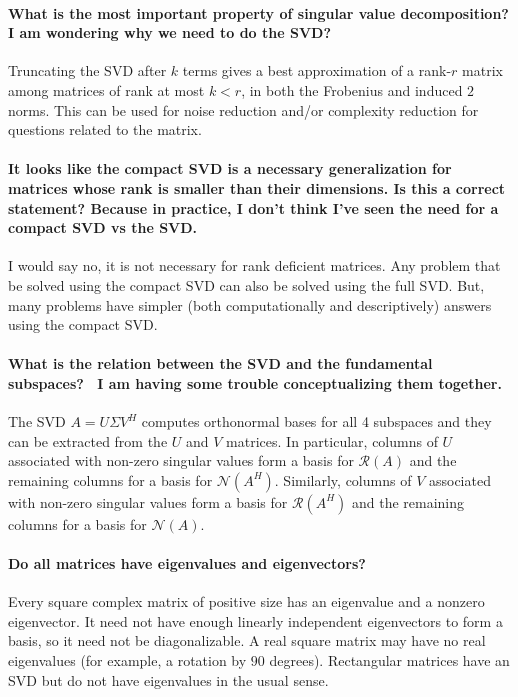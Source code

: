\documentclass[10pt,english]{article}
\begin{document}
\paragraph{What is the most important property of singular value decomposition? I am wondering why we need to do the SVD?}

Truncating the SVD after $k$ terms gives a best approximation of a rank-$r$ matrix among matrices of rank at most $k<r$, in both the Frobenius and induced $2$ norms.
This can be used for noise reduction and/or complexity reduction for questions related to the matrix.




\paragraph{It looks like the compact SVD is a necessary generalization for matrices whose rank is smaller than their dimensions. Is this a correct statement? Because in practice, I don't think I've seen the need for a compact SVD vs the SVD.}

I would say no, it is not necessary for rank deficient matrices.
Any problem that be solved using the compact SVD can also be solved using the full SVD.
But, many problems have simpler (both computationally and descriptively) answers using the compact SVD.


\paragraph{What is the relation between the SVD and the fundamental subspaces?  I am having some trouble conceptualizing them together.}

The SVD $A = U\Sigma V^H$ computes orthonormal bases for all 4 subspaces and they can be extracted from the $U$ and $V$ matrices.
In particular, columns of $U$ associated with non-zero singular values form a basis for $\mathcal{R}(A)$ and the remaining columns for a basis for $\mathcal{N}(A^H)$.
Similarly, columns of $V$ associated with non-zero singular values form a basis for $\mathcal{R}(A^H)$ and the remaining columns for a basis for $\mathcal{N}(A)$.

\paragraph{Do all matrices have eigenvalues and eigenvectors?}


Every square complex matrix of positive size has an eigenvalue and a nonzero eigenvector.
It need not have enough linearly independent eigenvectors to form a basis, so it need not be diagonalizable.
A real square matrix may have no real eigenvalues (for example, a rotation by $90$ degrees).
Rectangular matrices have an SVD but do not have eigenvalues in the usual sense.
\end{document}
